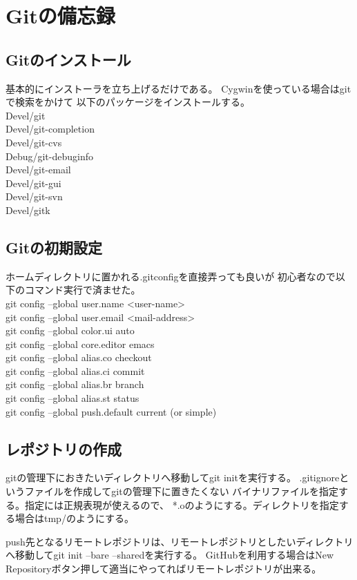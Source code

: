 \chapter{Gitの備忘録}
\section{Gitのインストール}
基本的にインストーラを立ち上げるだけである。
Cygwinを使っている場合はgitで検索をかけて
以下のパッケージをインストールする\cite{qiita_kanpou}。\\
Devel/git\\Devel/git-completion\\Devel/git-cvs\\
Debug/git-debuginfo\\Devel/git-email\\Devel/git-gui\\
Devel/git-svn\\Devel/gitk
\section{Gitの初期設定}
ホームディレクトリに置かれる.gitconfigを直接弄っても良いが
初心者なので以下のコマンド実行で済ませた。\\
git config --global user.name <user-name>\\
git config --global user.email <mail-address>\\
git config --global color.ui auto\\
git config --global core.editor emacs\\
git config --global alias.co checkout\\
git config --global alias.ci commit\\
git config --global alias.br branch\\
git config --global alias.st status\\
git config --global push.default current (or simple)\\
\section{レポジトリの作成}
gitの管理下におきたいディレクトリへ移動してgit initを実行する。
.gitignoreというファイルを作成してgitの管理下に置きたくない
バイナリファイルを指定する。指定には正規表現が使えるので、
*.oのようにする。ディレクトリを指定する場合はtmp/のようにする。

push先となるリモートレポジトリは、リモートレポジトリとしたいディレクトリへ移動してgit init --bare --sharedを実行する。
GitHubを利用する場合はNew Repositoryボタン押して適当にやってればリモートレポジトリが出来る。
